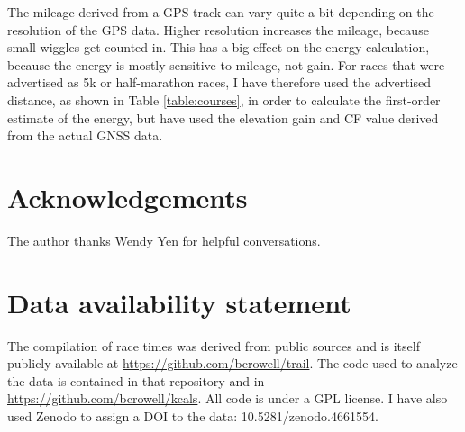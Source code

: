 \documentclass[10pt,letterpaper]{article}
\begin{document}
The mileage derived from a GPS track can vary quite a bit depending on the resolution of the GPS data.
Higher resolution increases the mileage, because small wiggles get counted in. This has a big effect on
the energy calculation, because the energy is mostly sensitive to mileage, not gain. For races
that were advertised as 5k or half-marathon races, I have therefore used the advertised distance,
as shown in Table \ref{table:courses},
in order to calculate the first-order estimate of the energy, but have used the elevation gain and
CF value derived from the actual GNSS data.

\section*{Acknowledgements}

The author thanks Wendy Yen for helpful conversations.

\section*{Data availability statement}

The compilation
of race times was derived from public sources and is itself publicly available at \url{https://github.com/bcrowell/trail}.
The code used to analyze the data is contained in that repository and in \url{https://github.com/bcrowell/kcals}.
All code is under a GPL license.
I have also used Zenodo to
assign a DOI to the data: 10.5281/zenodo.4661554.


\end{document}
